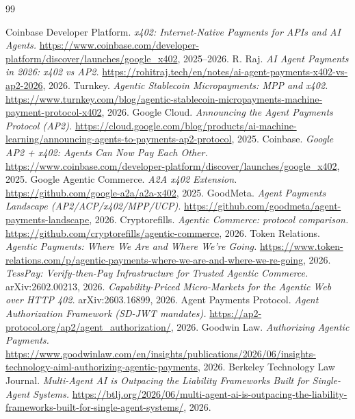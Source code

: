 \documentclass[11pt]{article}
\begin{document}
\small
\begin{thebibliography}{99}
\setlength{\itemsep}{1pt}

 Coinbase Developer Platform. \emph{x402: Internet-Native Payments for APIs and AI Agents.} \url{https://www.coinbase.com/developer-platform/discover/launches/google_x402}, 2025--2026.
 R. Raj. \emph{AI Agent Payments in 2026: x402 vs AP2.} \url{https://rohitraj.tech/en/notes/ai-agent-payments-x402-vs-ap2-2026}, 2026.
 Turnkey. \emph{Agentic Stablecoin Micropayments: MPP and x402.} \url{https://www.turnkey.com/blog/agentic-stablecoin-micropayments-machine-payment-protocol-x402}, 2026.
 Google Cloud. \emph{Announcing the Agent Payments Protocol (AP2).} \url{https://cloud.google.com/blog/products/ai-machine-learning/announcing-agents-to-payments-ap2-protocol}, 2025.
 Coinbase. \emph{Google AP2 + x402: Agents Can Now Pay Each Other.} \url{https://www.coinbase.com/developer-platform/discover/launches/google_x402}, 2025.
 Google Agentic Commerce. \emph{A2A x402 Extension.} \url{https://github.com/google-a2a/a2a-x402}, 2025.
 GoodMeta. \emph{Agent Payments Landscape (AP2/ACP/x402/MPP/UCP).} \url{https://github.com/goodmeta/agent-payments-landscape}, 2026.
 Cryptorefills. \emph{Agentic Commerce: protocol comparison.} \url{https://github.com/cryptorefills/agentic-commerce}, 2026.
 Token Relations. \emph{Agentic Payments: Where We Are and Where We're Going.} \url{https://www.token-relations.com/p/agentic-payments-where-we-are-and-where-we-re-going}, 2026.
 \emph{TessPay: Verify-then-Pay Infrastructure for Trusted Agentic Commerce.} arXiv:2602.00213, 2026.
 \emph{Capability-Priced Micro-Markets for the Agentic Web over HTTP 402.} arXiv:2603.16899, 2026.
 Agent Payments Protocol. \emph{Agent Authorization Framework (SD-JWT mandates).} \url{https://ap2-protocol.org/ap2/agent_authorization/}, 2026.
 Goodwin Law. \emph{Authorizing Agentic Payments.} \url{https://www.goodwinlaw.com/en/insights/publications/2026/06/insights-technology-aiml-authorizing-agentic-payments}, 2026.
 Berkeley Technology Law Journal. \emph{Multi-Agent AI is Outpacing the Liability Frameworks Built for Single-Agent Systems.} \url{https://btlj.org/2026/06/multi-agent-ai-is-outpacing-the-liability-frameworks-built-for-single-agent-systems/}, 2026.

\end{thebibliography}
\end{document}
